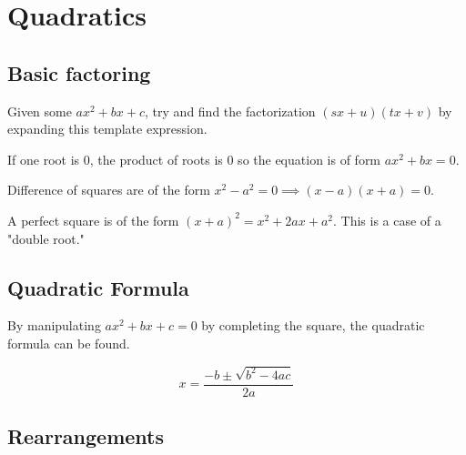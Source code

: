 \section{Quadratics}

\subsection{Basic factoring}

Given some $ax^2+bx+c$, try and find the factorization $(sx+u)(tx+v)$ by expanding this template expression.

\begin{lemma}
    If one root is 0, the product of roots is 0 so
    the equation is of form $ax^2+bx=0$.
\end{lemma}

\begin{lemma}
    Difference of squares are of the form $x^2-a^2=0\implies (x-a)(x+a)=0$.
\end{lemma}

\begin{lemma}
    A perfect square is of the form $(x+a)^2=x^2+2ax+a^2$. This is a case of a "double root."
\end{lemma}

\subsection{Quadratic Formula}

By manipulating $ax^2+bx+c=0$ by completing the square, the quadratic formula can be found.

\begin{equation}
    x=\frac{-b\pm \sqrt{b^2-4ac}}{2a}
\end{equation}

\subsection{Rearrangements}

